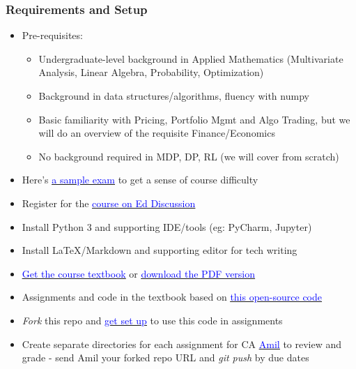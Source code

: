 \documentclass[handout]{beamer}
\begin{document}
\begin{frame}
\frametitle{Requirements and Setup}
\pause
\begin{itemize}[<+->]
\item Pre-requisites:
\begin{itemize}
\item Undergraduate-level background in Applied Mathematics (Multivariate Analysis, Linear Algebra, Probability, Optimization)
\item Background in data structures/algorithms, fluency with numpy
\item Basic familiarity with Pricing, Portfolio Mgmt and Algo Trading, but we will do an overview of the requisite Finance/Economics
\item No background required in MDP, DP, RL (we will cover from scratch)
\end{itemize}
\item Here's \href{http://web.stanford.edu/class/cme241/lecture_slides/final-2021.pdf}{\underline{\textcolor{blue}{a sample exam}}}  to get a sense of course difficulty
\item Register for the \href{https://edstem.org/us/courses/31295}{\underline{\textcolor{blue}{course on Ed Discussion}}}
\item Install Python 3 and supporting IDE/tools (eg: PyCharm, Jupyter)
\item Install LaTeX/Markdown and supporting editor for tech writing
\item \href{https://www.amazon.com/Foundations-Reinforcement-Learning-Applications-Finance-ebook/dp/B0BJTR8D5L}{\underline{\textcolor{blue}{Get the course textbook}}} or \href{https://stanford.edu/~ashlearn/RLForFinanceBook/book.pdf}{\underline{\textcolor{blue}{download the PDF version}}}
\item Assignments and code in the textbook based on \href{https://github.com/TikhonJelvis/RL-Book}{\underline{\textcolor{blue}{this open-source code}}}
\item {\em Fork} this repo and \href{http://web.stanford.edu/class/cme241/lecture_slides/assignments/assignment1.pdf}{\underline{\textcolor{blue}{get set up}}} to use this code in assignments
\item Create separate directories for each assignment for CA \href{mailto:amil@stanford.edu}{\underline{\textcolor{blue}{Amil}}} to review and grade - send Amil your forked repo URL and {\em git push} by due dates
\end{itemize}
\end{frame}
\end{document}
